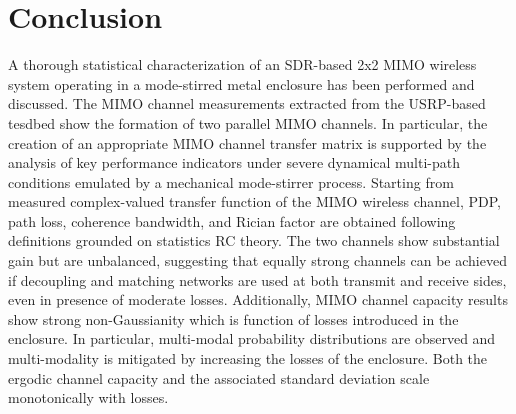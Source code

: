 \documentclass[10pt, final, journal, letterpaper, oneside, twocolumn]{IEEEtran}
\begin{document}
\section{Conclusion}
A thorough statistical characterization of an SDR-based 2x2 MIMO wireless system operating in a mode-stirred metal enclosure has been performed and discussed. The MIMO channel measurements extracted from the USRP-based tesdbed show the formation of two parallel MIMO channels. In particular, the creation of an appropriate MIMO channel transfer matrix is supported by the analysis of key performance indicators under severe dynamical multi-path conditions emulated by a mechanical mode-stirrer process. Starting from measured complex-valued transfer function of the MIMO wireless channel, PDP, path loss, coherence bandwidth, and Rician factor are obtained following definitions grounded on statistics RC theory. The two channels show substantial gain but are unbalanced, suggesting that equally strong channels can be achieved if decoupling and matching networks are used at both transmit and receive sides, even in presence of moderate losses. Additionally, MIMO channel capacity results show strong non-Gaussianity which is function of losses introduced in the enclosure. In particular, multi-modal probability distributions are observed and multi-modality is mitigated by increasing the losses of the enclosure. Both the ergodic channel capacity and the associated standard deviation scale monotonically with losses. 




 
\end{document}
